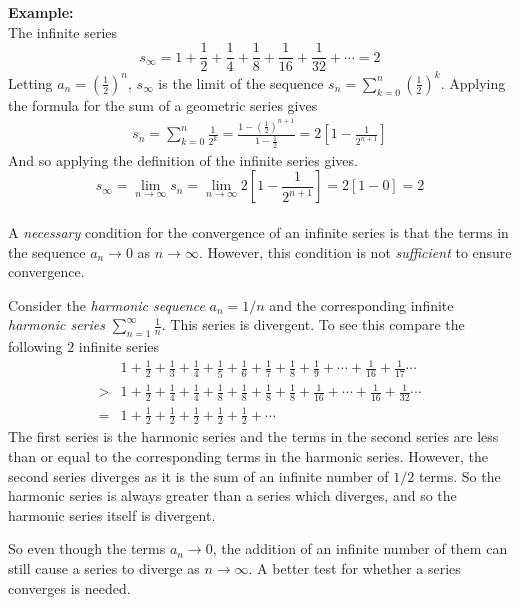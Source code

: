 \noindent  \textbf{Example:}\\
The infinite series
\begin{equation*}
  s_\infty = 1+\frac{1}{2}+\frac{1}{4}+\frac{1}{8}+\frac{1}{16}+\frac{1}{32}+\cdots = 2
\end{equation*}
Letting $a_n=\left(\frac{1}{2}\right)^n$, $s_\infty$ is the limit of the sequence $s_n=\sum_{k=0}^{n} \left(\frac{1}{2}\right)^k$. Applying the formula for the sum of a geometric series gives 
\begin{align*}
  s_n = \sum_{k=0}^{n} \frac{1}{2^k} = \frac{1- \left( \frac{1}{2} \right)^{n+1} }{1-\frac{1}{2}} = 2 \left[ 1-\frac{1}{2^{n+1}} \right]
\end{align*}
And so applying the definition of the infinite series gives.
\begin{equation*}
  s_\infty=\lim_{n \to \infty} s_n = \lim_{n \to \infty} 2 \left[ 1- \frac{1}{2^{n+1}} \right]= 2 \left[ 1-0 \right] = 2
\end{equation*}\\
A \emph{necessary} condition for the convergence of an infinite series is that the terms in the sequence $a_n \to 0$ as $n \to \infty$. However, this condition is not \emph{sufficient} to ensure convergence.

Consider the \emph{harmonic sequence} $a_n=1/n$ and the corresponding infinite \emph{harmonic series} $\displaystyle \sum_{n=1}^{\infty} \frac{1}{n}$. This series is divergent. To see this compare the following $2$ infinite series
\begin{align*}
  &1+\frac{1}{2}+\frac{1}{3}+\frac{1}{4}+\frac{1}{5}+\frac{1}{6}+\frac{1}{7}+\frac{1}{8}+\frac{1}{9}+\cdots+\frac{1}{16}+\frac{1}{17}\cdots\\
  >&1+\frac{1}{2}+\frac{1}{4}+\frac{1}{4}+\frac{1}{8}+\frac{1}{8}+\frac{1}{8}+\frac{1}{8}+\frac{1}{16}+\cdots+\frac{1}{16}+\frac{1}{32}\cdots\\
  = & 1+\frac{1}{2}+\frac{1}{2}+\frac{1}{2}+\frac{1}{2}+\frac{1}{2}+\cdots
\end{align*}
The first series is the harmonic series and the terms in the second series are less than or equal to the corresponding terms in the harmonic series. However, the second series diverges as it is the sum of an infinite number of $1/2$ terms. So the harmonic series is always greater than a series which diverges, and so the harmonic series itself is divergent.

So even though the terms $a_n \to 0$, the addition of an infinite number of them can still cause a series to diverge as $n \to \infty $. A better test for whether a series converges is needed.

